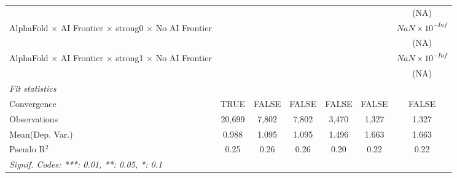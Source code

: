 \begin{tabular}{lcccccc}
                                                                              &               &        &        &                        &                        & (NA)\\   
   AlphaFold $\times$ AI Frontier $\times$ strong0 $\times$ No AI Frontier    &               &        &        &                        &                        & $NaN\times 10^{-Inf}$\\    
                                                                              &               &        &        &                        &                        & (NA)\\   
   AlphaFold $\times$ AI Frontier $\times$ strong1 $\times$ No AI Frontier    &               &        &        &                        &                        & $NaN\times 10^{-Inf}$\\    
                                                                              &               &        &        &                        &                        & (NA)\\   
   \midrule
   \emph{Fit statistics}\\
   Convergence                                                                &TRUE           & FALSE  & FALSE  & FALSE                  & FALSE                  & FALSE\\  
   Observations                                                               & 20,699        & 7,802  & 7,802  & 3,470                  & 1,327                  & 1,327\\  
Mean(Dep. Var.) & 0.988 & 1.095 & 1.095 & 1.496 & 1.663 & 1.663 \\
   Pseudo R$^2$                                                               & 0.25          & 0.26   & 0.26   & 0.20                   & 0.22                   & 0.22\\  
   \midrule \midrule
   \multicolumn{7}{l}{\emph{Signif. Codes: ***: 0.01, **: 0.05, *: 0.1}}\\
\end{tabular}
\par\endgroup
